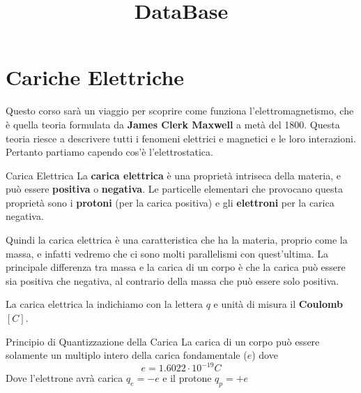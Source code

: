 \documentclass{rapport}
\title{DataBase} %
\begin{document}

\subject{Fisica 2} %


        
\buildmargins %
\buildcover %
\toc %




\section{Cariche Elettriche}
Questo corso sarà un viaggio per scoprire come funziona l'elettromagnetismo, che è quella teoria formulata da \textbf{ James Clerk Maxwell} a metà del 1800. Questa teoria riesce a descrivere tutti i fenomeni elettrici e magnetici e le loro interazioni. Pertanto partiamo capendo cos'è l'elettrostatica.

\begin{definizione}{Carica Elettrica}{}
  La \textbf{carica elettrica} è una proprietà intriseca della materia, e può essere \textbf{positiva} o \textbf{negativa}. Le particelle elementari che provocano questa proprietà sono i \textbf{protoni} (per la carica positiva) e gli \textbf{elettroni} per la carica negativa.
\end{definizione}

Quindi la carica elettrica è una caratteristica che ha la materia, proprio come la massa, e infatti vedremo che ci sono molti parallelismi con quest'ultima. La principale differenza tra massa e la carica di un corpo è che la carica può essere sia positiva che negativa, al contrario della massa che può essere solo positiva.

La carica elettrica la indichiamo con la lettera $q$ e unità di misura il \textbf{Coulomb} $[C]$.

\begin{proposizione}{Principio di Quantizzazione della Carica}{}
  La carica di un corpo può essere solamente un multiplo intero della carica fondamentale ($e$) dove 
  \[
  e = 1.6022 \cdot 10^{-19} C
  \]
  Dove l'elettrone avrà carica $q_e = -e$ e il protone $q_p = +e$
\end{proposizione}
\end{document}
